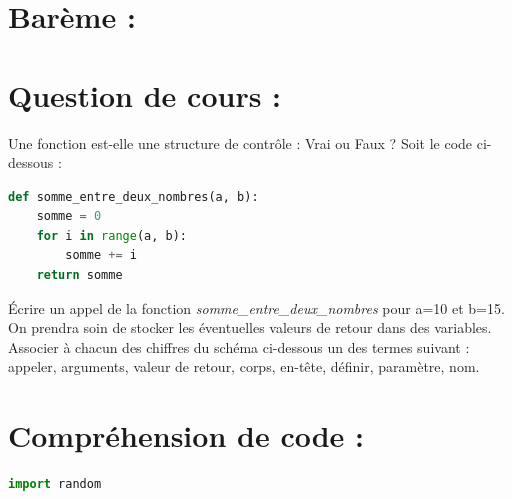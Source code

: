 \documentclass[a4paper, noanswers, addpoints, 12pt]{exam}
\begin{document}
\section*{Barème :}
\begin{center}
  \par\bigskip
  \gradetable[h]
\end{center}
\begin{questions}

\vspace{0.5cm}
\section{Question de cours : }

\question[1] Une fonction est-elle une structure de contrôle : Vrai ou Faux ?
\question[3] Soit le code ci-dessous :
\begin{lstlisting}[style=mystyle, language=Python]
def somme_entre_deux_nombres(a, b):
    somme = 0
    for i in range(a, b):
        somme += i
    return somme
\end{lstlisting}
\question[2]Écrire un appel de la fonction \textit{somme\_entre\_deux\_nombres} pour a=10 et b=15. On prendra soin de stocker les éventuelles valeurs de retour dans des variables.
\question[4] Associer à chacun des chiffres du schéma ci-dessous un des termes suivant : appeler, arguments, valeur de retour, corps, en-tête, définir, paramètre, nom. \begin{figure}[h]
    \centering
    
    \label{fig:schema-a-trou}
\end{figure}

\section{Compréhension de code : }
\begin{lstlisting}[style=mystyle, language=Python]
import random


\end{lstlisting}
\end{questions}
\end{document}
